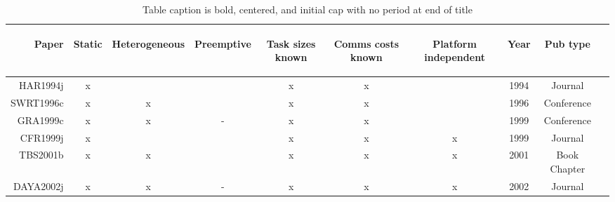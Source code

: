 \documentclass[11pt,letterpaper,twoside,english,final]{article}
\begin{document}
{\begin{table}[h]
\centering
\caption{Table caption is bold, centered, and initial cap with no period at end of title}
\begin{tabular}{|r|ccccccc|c|c|}\hline 
\begin{sideways}Paper\end{sideways} &\begin{sideways}Static\end{sideways} 
&\begin{sideways}Heterogeneous\end{sideways} &\begin{sideways}Preemptive\end{sideways} 
&\begin{sideways}Task sizes known\end{sideways} &\begin{sideways}Comms costs known\end{sideways} &\begin{sideways}Platform independent\end{sideways} &\begin{sideways}Year\end{sideways} &\begin{sideways}Pub type\end{sideways}\\
\hline
HAR1994j &x & & &x &x & &1994 & Journal \\
SWRT1996c &x &x & &x &x & &1996 & Conference \\
GRA1999c &x &x &- &x &x & &1999 & Conference \\
CFR1999j &x & & &x &x &x &1999 & Journal \\
TBS2001b &x &x & &x &x &x &2001 & Book Chapter \\
DAYA2002j &x &x &- &x &x &x &2002 & Journal \\
\hline
\end{tabular}
\end{table}

}
\end{document}
